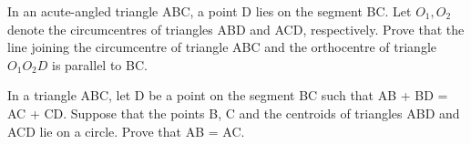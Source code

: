 \item In an acute-angled triangle ABC, a point D lies on the segment BC. Let $O_1, O_2$ denote the circumcentres of triangles ABD and ACD, respectively. Prove that the line joining the circumcentre of triangle ABC and the orthocentre of triangle $O_{1}O_{2}D$ is parallel to BC.

\item In a triangle ABC, let D be a point on the segment BC such that AB + BD = AC + CD. Suppose that the
points B, C and the centroids of triangles ABD and ACD lie on a circle. Prove that AB = AC.























